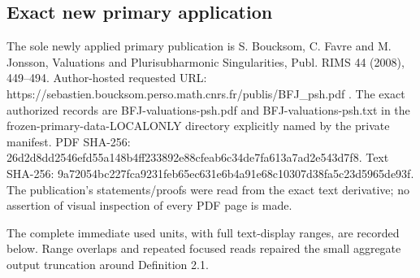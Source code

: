 \documentclass[11pt]{article}
\begin{document}
\subsection{Exact new primary application}

The sole newly applied primary publication is S. Boucksom, C. Favre and M. Jonsson, Valuations and Plurisubharmonic Singularities, Publ. RIMS 44 (2008), 449--494. Author-hosted requested URL: https://sebastien.boucksom.perso.math.cnrs.fr/publis/BFJ\_psh.pdf . The exact authorized records are BFJ-valuations-psh.pdf and BFJ-valuations-psh.txt in the frozen-primary-data-LOCALONLY directory explicitly named by the private manifest. PDF SHA-256: 26d2d8dd2546efd55a148b4ff233892e88cfeab6c34de7fa613a7ad2e543d7f8. Text SHA-256: 9a72054bc227fca9231feb65ec631e6b4a91e68c10307d38fa5c23d5965de93f. The publication's statements/proofs were read from the exact text derivative; no assertion of visual inspection of every PDF page is made.

The complete immediate used units, with full text-display ranges, are recorded below. Range overlaps and repeated focused reads repaired the small aggregate output truncation around Definition 2.1.
\end{document}
